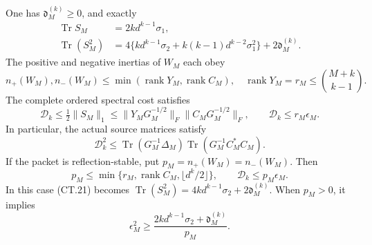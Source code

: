 \begin{theorem}
One has \(\mathfrak d_M^{(k)}\ge0\), and exactly
\[
 \begin{split}
 \operatorname{Tr}S_M&=2k d^{k-1}\sigma_1,\\
 \operatorname{Tr}(S_M^2)
    &=4\{kd^{k-1}\sigma_2+k(k-1)d^{k-2}\sigma_1^2\}
                        +2\mathfrak d_M^{(k)}.
 \end{split}                                             \tag{CT.21}
\]
The positive and negative inertias of \(W_M\) each obey
\[
 n_+(W_M),n_-(W_M)\le
 \min(\operatorname{rank}Y_M,\operatorname{rank}C_M),
 \quad \operatorname{rank}Y_M=r_M
           \le\binom{M+k}{k-1}.                         \tag{CT.22}
\]
The complete ordered spectral cost satisfies
\[
 \boxed{\mathcal D_k\le\tfrac12\|S_M\|_1
      \le \|Y_MG_M^{-1/2}\|_F\|C_MG_M^{-1/2}\|_F,}
 \qquad \mathcal D_k\le r_M\epsilon_M.                  \tag{CT.23}
\]
In particular, the actual source matrices satisfy
\[
 \mathcal D_k^2\le
 \operatorname{Tr}(G_M^{-1}\Delta_M)
                  \operatorname{Tr}(G_M^{-1}C_M^*C_M).
 \tag{CT.24}
\]
If the packet is reflection-stable, put
\(p_M=n_+(W_M)=n_-(W_M)\).  Then
\[
 p_M\le\min\{r_M,\operatorname{rank}C_M,
                         \lfloor d^k/2\rfloor\},\qquad
 \mathcal D_k\le p_M\epsilon_M.                         \tag{CT.24a}
\]
In this case (CT.21) becomes
\(\operatorname{Tr}(S_M^2)=4kd^{k-1}\sigma_2
+2\mathfrak d_M^{(k)}\).  When \(p_M>0\), it implies
\[
 \epsilon_M^2\ge
       \frac{2kd^{k-1}\sigma_2+\mathfrak d_M^{(k)}}{p_M}.
 \tag{CT.25}
\]
\end{theorem}

